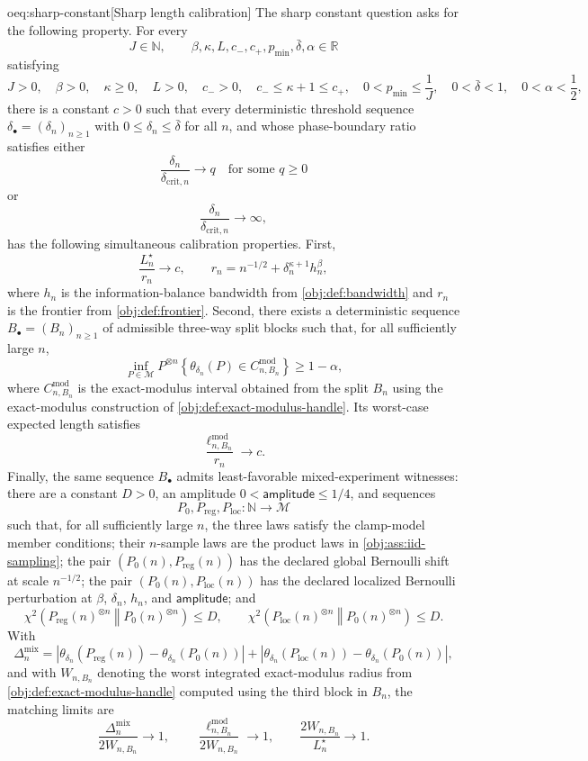 \begin{remarkv}{oeq:sharp-constant}[Sharp length calibration]
The sharp constant question asks for the following property. For every
\[
 J\in\mathbb N,\qquad
 \beta,\kappa,L,c_-,c_+,p_{\min},\bar\delta,\alpha\in\mathbb R
\]
satisfying
\[
 J>0,\quad \beta>0,\quad \kappa\geq0,\quad L>0,\quad c_->0,\quad
 c_-\leq \kappa+1\leq c_+,\quad
 0<p_{\min}\leq \frac1J,\quad
 0<\bar\delta<1,\quad 0<\alpha<\frac12,
\]
there is a constant \(c>0\) such that every deterministic threshold sequence
\(\delta_{\bullet}=(\delta_n)_{n\geq1}\) with \(0\leq\delta_n\leq\bar\delta\) for all \(n\), and whose phase-boundary ratio satisfies either
\[
 \frac{\delta_n}{\delta_{\mathrm{crit},n}}\longrightarrow q
 \quad\text{for some }q\geq0
\]
or
\[
 \frac{\delta_n}{\delta_{\mathrm{crit},n}}\longrightarrow\infty,
\]
has the following simultaneous calibration properties. First,
\[
 \frac{L_n^\star}{r_n}\longrightarrow c,
 \qquad
 r_n=n^{-1/2}+\delta_n^{\kappa+1}h_n^\beta,
\]
where \(h_n\) is the information-balance bandwidth from \cref{obj:def:bandwidth} and \(r_n\) is the frontier from \cref{obj:def:frontier}. Second, there exists a deterministic sequence
\(B_{\bullet}=(B_n)_{n\geq1}\) of admissible three-way split blocks such that, for all sufficiently large \(n\),
\[
 \inf_{P\in\mathcal M}
 P^{\otimes n}
 \left\{
   \theta_{\delta_n}(P)\in C^{\mathrm{mod}}_{n,B_n}
 \right\}
 \geq 1-\alpha,
\]
where \(C^{\mathrm{mod}}_{n,B_n}\) is the exact-modulus interval obtained from the split \(B_n\) using the exact-modulus construction of \cref{obj:def:exact-modulus-handle}. Its worst-case expected length satisfies
\[
 \frac{\ell^{\mathrm{mod}}_{n,B_n}}{r_n}\longrightarrow c.
\]
Finally, the same sequence \(B_{\bullet}\) admits least-favorable mixed-experiment witnesses: there are a constant \(D>0\), an amplitude \(0<\mathsf{amplitude}\leq1/4\), and sequences
\[
 P_0,P_{\mathrm{reg}},P_{\mathrm{loc}}:\mathbb N\to\mathcal M
\]
such that, for all sufficiently large \(n\), the three laws satisfy the clamp-model member conditions; their \(n\)-sample laws are the product laws in \cref{obj:ass:iid-sampling}; the pair \((P_0(n),P_{\mathrm{reg}}(n))\) has the declared global Bernoulli shift at scale \(n^{-1/2}\); the pair \((P_0(n),P_{\mathrm{loc}}(n))\) has the declared localized Bernoulli perturbation at \(\beta\), \(\delta_n\), \(h_n\), and \(\mathsf{amplitude}\); and
\[
 \chi^2\!\left(P_{\mathrm{reg}}(n)^{\otimes n}\middle\Vert P_0(n)^{\otimes n}\right)\leq D,
 \qquad
 \chi^2\!\left(P_{\mathrm{loc}}(n)^{\otimes n}\middle\Vert P_0(n)^{\otimes n}\right)\leq D.
\]
With
\[
 \Delta_n^{\mathrm{mix}}
 =
 \left|\theta_{\delta_n}\!\left(P_{\mathrm{reg}}(n)\right)-
          \theta_{\delta_n}\!\left(P_0(n)\right)\right|
  +
 \left|\theta_{\delta_n}\!\left(P_{\mathrm{loc}}(n)\right)-
          \theta_{\delta_n}\!\left(P_0(n)\right)\right|,
\]
and with \(W_{n,B_n}\) denoting the worst integrated exact-modulus radius from
\cref{obj:def:exact-modulus-handle} computed using the third block in \(B_n\), the matching limits are
\[
 \frac{\Delta_n^{\mathrm{mix}}}{2W_{n,B_n}}\longrightarrow1,
 \qquad
 \frac{\ell^{\mathrm{mod}}_{n,B_n}}{2W_{n,B_n}}\longrightarrow1,
 \qquad
 \frac{2W_{n,B_n}}{L_n^\star}\longrightarrow1.
\]
\end{remarkv}

